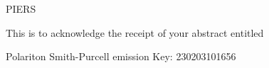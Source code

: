 PIERS

This is to acknowledge the receipt of your abstract entitled

Polariton Smith-Purcell emission
Key: 230203101656
